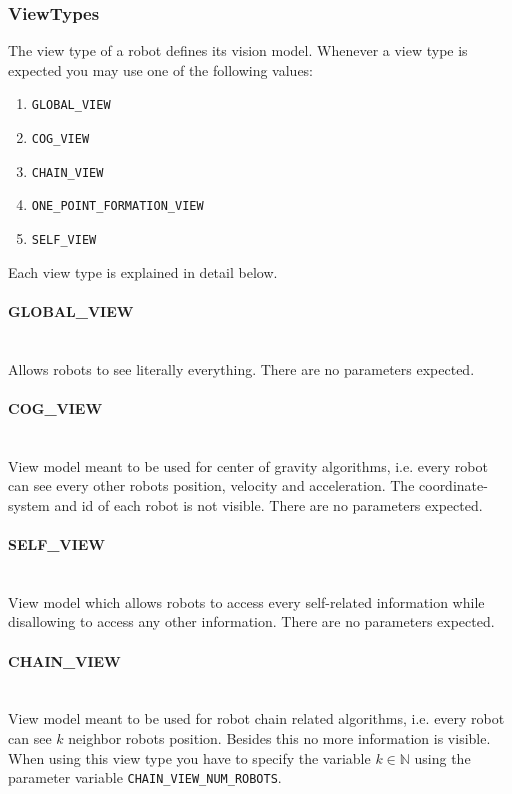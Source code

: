 \subsubsection{ViewTypes}\label{sec:viewtypes}
The view type of a robot defines its vision model. Whenever a view type is expected you may use one of the following values:
\begin{enumerate}
	\item \texttt{GLOBAL\_VIEW}
	\item \texttt{COG\_VIEW}
	\item \texttt{CHAIN\_VIEW}
	\item \texttt{ONE\_POINT\_FORMATION\_VIEW}
	\item \texttt{SELF\_VIEW}
\end{enumerate}
Each view type is explained in detail below.

\paragraph{GLOBAL\_VIEW} \ \\
Allows robots to see literally everything. There are no parameters expected.

\paragraph{COG\_VIEW} \ \\
View model meant to be used for center of gravity algorithms, i.e. every robot can see every other robots position, velocity and acceleration. The coordinate-system and id of each robot is not visible. There are no parameters expected.

\paragraph{SELF\_VIEW} \ \\
View model which allows robots to access every self-related information while disallowing to access any other information. There are no parameters expected.

\paragraph{CHAIN\_VIEW} \ \\
View model meant to be used for robot chain related algorithms, i.e. every robot can see $k$ neighbor robots position. Besides this no more information is visible. When using this view type you have to specify the variable $k \in \mathbb{N}$ using the parameter variable \texttt{CHAIN\_VIEW\_NUM\_ROBOTS}.


